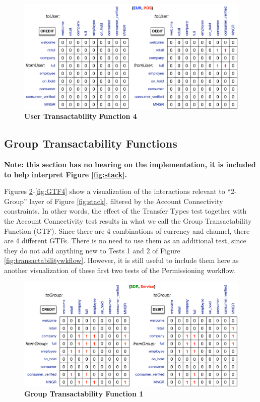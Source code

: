 \begin{figure}[H]
\vspace{-0.5cm}
\centering
\includegraphics[width=16cm]{Figures/UTF4}
\caption{\small\textbf{User Transactability Function 4}}
\label{fig:UTF4}
\end{figure}



\subsection{Group Transactability Functions}
\textbf{\small Note: this section has no bearing on the implementation, it is included to help interpret Figure \ref{fig:stack}.}

Figures \ref{fig:GTF1}-\ref{fig:GTF4} show a visualization of the interactions relevant to ``2-Group'' layer of Figure \ref{fig:stack}, filtered by the Account Connectivity constraints. In other words, the effect of the Transfer Types test together with the Account Connectivity test results in what we call the Group Transactability Function (GTF). Since there are 4 combinations of currency and channel, there are 4 different GTFs. There is no need to use them as an additional test, since they do not add anything new to Tests 1 and 2 of Figure \ref{fig:transactabilitywkflow}. However, it is still useful to include them here as another visualization of these first two tests of the Permissioning workflow.

\begin{figure}[H]
\centering
\includegraphics[width=16cm]{Figures/GTF1}
\caption{\small\textbf{Group Transactability Function 1}}
\label{fig:GTF1}
\end{figure}

